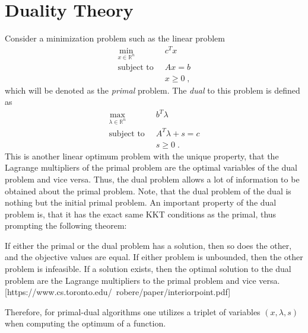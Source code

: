 \section{Duality Theory}
Consider a minimization problem such as the linear problem
\begin{align*}
	\min_{x \in \mathbb{R}^n} \;  & \; c^T x \\
	\text{subject to} \;  & \; A x = b  \\
							& \; x \geq 0 \; ,
\end{align*}
which will be denoted as the \textit{primal} problem. The \textit{dual} to this problem is defined as 
\begin{align*}
	\max_{\lambda \in \mathbb{R}^n} \;  & \; b^T \lambda \\
	\text{subject to} \;  & \; A^T \lambda + s = c  \\
							& \; s \geq 0 \; .
\end{align*}
This is another linear optimum problem with the unique property, that the Lagrange multipliers of the primal problem are the optimal variables of the dual problem and vice versa. Thus, the dual problem allows a lot of information to be obtained about the primal problem. Note, that the dual problem of the dual is nothing but the initial primal problem.
An important property of the dual problem is, that it has the exact same KKT conditions as the primal, thus prompting the following theorem:
\begin{theorem}
If either the primal or the dual problem has a solution, then so does the other, and the objective values are equal. If either problem is unbounded, then the other problem is infeasible. If a solution exists, then the optimal solution to the dual problem are the Lagrange multipliers to the primal problem and vice versa. [https://www.cs.toronto.edu/~robere/paper/interiorpoint.pdf]
\end{theorem}

Therefore, for primal-dual algorithms one utilizes a triplet of variables $(x , \lambda , s)$ when computing the optimum of a function.

